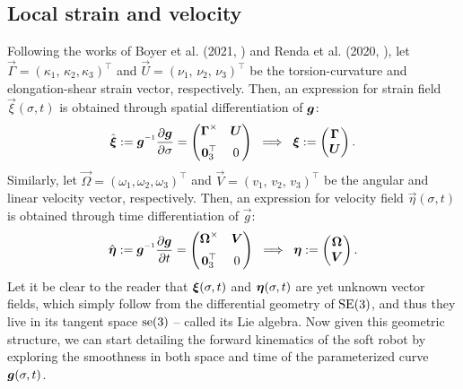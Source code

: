 \subsection{Local strain and velocity}
Following the works of Boyer et al. (2021, \cite{Boyer2021}) and Renda et al. (2020, \cite{Renda2018,Renda2020}), let $\vec{\Gamma} = (\kappa_1,\, \kappa_2, \kappa_3)^\top$ and $\vec{U} = (\nu_1,\, \nu_2,\, \nu_3)^\top$ be the torsion-curvature and elongation-shear strain vector, respectively. Then, an expression for strain field $\vec{\xi}(\sigma,t)$ is obtained through spatial differentiation of $\boldsymbol{g}$:
%
\begin{equation}
\hat{\vec{\xi}} := \mat{g}\inv \frac{\p \mat{g}}{\p \sigma} = \begin{pmatrix} \vec{\Gamma}^\times & \vec{U} \\[0.5em] \vec{0}_3^\top & 0 \end{pmatrix} \;\; \Longrightarrow \;\; \vec{\xi} := \begin{pmatrix} \vec{\Gamma} \\ \vec{U} \end{pmatrix}.
\label{eq:C3:xi}
\end{equation}
%
Similarly, let $\vec{\Omega} = (\omega_1, \omega_2, \omega_3)^\top$ and $\vec{V} = (v_1,\,v_2,\, v_3)^\top$ be the angular and linear velocity vector, respectively. Then, an expression for velocity field $\vec{\eta}(\sigma,t)$ is obtained through time differentiation of $\vec{g}$:
%
\begin{equation}
\hat{\vec{\eta}} := \mat{g}\inv \frac{\p \mat{g}}{\p t} = \begin{pmatrix} \vec{\Omega}^\times & \vec{V} \\[0.5em] \vec{0}_3^\top & 0 \end{pmatrix} \;\; \Longrightarrow \;\; \vec{\eta} := \begin{pmatrix} \vec{\Omega} \\ \vec{V} \end{pmatrix}.
\label{eq:C3:eta}
\end{equation}
%
Let it be clear to the reader that ${\boldsymbol{\xi}}(\sigma,t)$ and ${\boldsymbol{\eta}}(\sigma,t)$ are yet unknown {vector fields}, which simply follow from the differential geometry of $\textup{\textrm{SE}}(3)$, and thus they live in its tangent space $\textup{\textrm{se}}(3)$ -- called its Lie algebra. Now given this geometric structure, we can start detailing the forward kinematics of the soft robot by exploring the smoothness in both space and time of the parameterized curve ${\boldsymbol{g}}(\sigma,t)$. 

